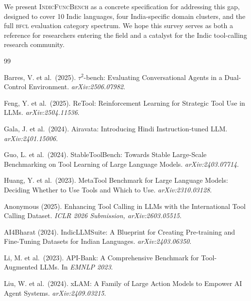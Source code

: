 \documentclass[11pt]{article}
\newcommand{\bfcl}{\textsc{bfcl}}
\begin{document}
We present \textsc{IndicFuncBench} as a concrete specification for addressing this gap, designed to
cover 10 Indic languages, four India-specific domain clusters, and the full \bfcl{} evaluation
category spectrum. We hope this survey serves as both a reference for researchers entering the field
and a catalyst for the Indic tool-calling research community.


\begin{thebibliography}{99}

Barres, V. et al.\ (2025).
\newblock $\tau^2$-bench: Evaluating Conversational Agents in a Dual-Control Environment.
\newblock \textit{arXiv:2506.07982}.

Feng, Y. et al.\ (2025).
\newblock ReTool: Reinforcement Learning for Strategic Tool Use in LLMs.
\newblock \textit{arXiv:2504.11536}.

Gala, J. et al.\ (2024).
\newblock Airavata: Introducing Hindi Instruction-tuned LLM.
\newblock \textit{arXiv:2401.15006}.

Guo, L. et al.\ (2024).
\newblock StableToolBench: Towards Stable Large-Scale Benchmarking on Tool Learning of Large Language Models.
\newblock \textit{arXiv:2403.07714}.

Huang, Y. et al.\ (2023).
\newblock MetaTool Benchmark for Large Language Models: Deciding Whether to Use Tools and Which to Use.
\newblock \textit{arXiv:2310.03128}.

Anonymous (2025).
\newblock Enhancing Tool Calling in LLMs with the International Tool Calling Dataset.
\newblock \textit{ICLR 2026 Submission, arXiv:2603.05515}.

AI4Bharat (2024).
\newblock IndicLLMSuite: A Blueprint for Creating Pre-training and Fine-Tuning Datasets for Indian Languages.
\newblock \textit{arXiv:2403.06350}.

Li, M. et al.\ (2023).
\newblock API-Bank: A Comprehensive Benchmark for Tool-Augmented LLMs.
\newblock In \textit{EMNLP 2023}.

Liu, W. et al.\ (2024).
\newblock xLAM: A Family of Large Action Models to Empower AI Agent Systems.
\newblock \textit{arXiv:2409.03215}.


\end{thebibliography}
\end{document}
